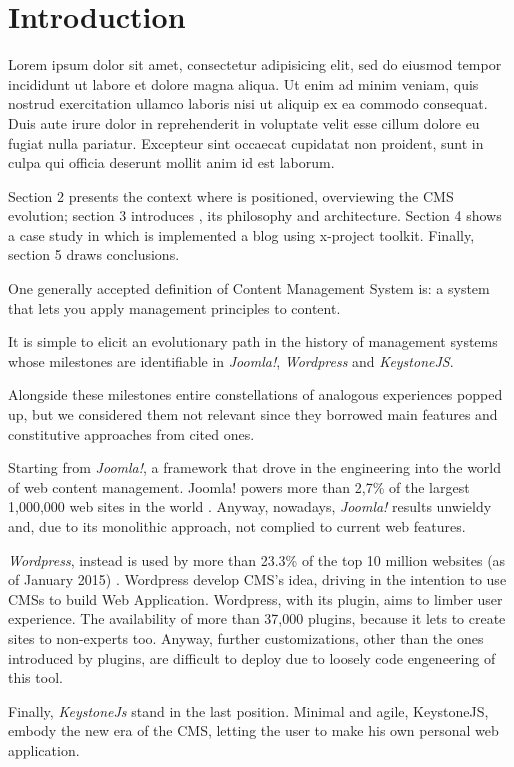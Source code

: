 \section{Introduction}
Lorem ipsum dolor sit amet, consectetur adipisicing elit, sed do eiusmod
tempor incididunt ut labore et dolore magna aliqua. Ut enim ad minim veniam,
quis nostrud exercitation ullamco laboris nisi ut aliquip ex ea commodo
consequat. Duis aute irure dolor in reprehenderit in voluptate velit esse
cillum dolore eu fugiat nulla pariatur. Excepteur sint occaecat cupidatat non
proident, sunt in culpa qui officia deserunt mollit anim id est laborum.


Section 2 presents the context where  is positioned, overviewing the CMS evolution; section 3 introduces , its philosophy and architecture. Section 4 shows a case study in which is implemented a blog using x-project toolkit. Finally, section 5 draws conclusions.


One generally accepted definition of Content Management System is: a system that lets you apply management principles to content.

It is simple to elicit an evolutionary path in the history of management systems whose milestones are identifiable in \emph{Joomla!}, \emph{Wordpress} and \emph{KeystoneJS}.

Alongside these milestones entire constellations of analogous experiences popped up, but we considered them not relevant since they borrowed main features and constitutive approaches from cited ones. 

Starting from \emph{Joomla!}, a framework that drove in the engineering into the world of web content management. Joomla! powers more than 2,7\% of the largest 1,000,000 web sites in the world \cite{usage-cms}. Anyway, nowadays, \emph{Joomla!} results unwieldy and, due to its monolithic approach, not complied to current web features.

\emph{Wordpress}, instead is used by more than 23.3\% of the top 10 million websites (as of January 2015) \cite{usage-cms}. Wordpress develop CMS’s idea, driving in the intention to use CMSs to build Web Application. Wordpress, with its plugin, aims to limber user experience. The availability of more than 37,000 plugins, because it lets to create sites to non-experts too.
Anyway, further customizations, other than the ones introduced by plugins, are difficult to deploy due to loosely code engeneering of this tool.

Finally, \emph{KeystoneJs} stand in the last position. Minimal and agile, KeystoneJS, embody the new era of the CMS, letting the user to make his own personal web application.

